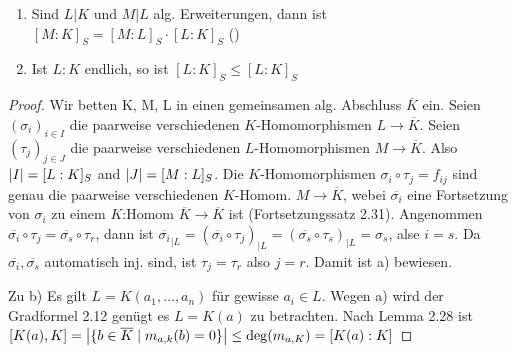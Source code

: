 \documentclass[../main.tex]{subfiles}
\begin{document}
\begin{lemma}
    \begin{enumerate}[label=\alph*)]
        \item Sind $L|K$ und $M|L$ alg. Erweiterungen, dann ist $[M:K]_S = [M:L]_S \cdot [L:K]_S$ ()
        \item Ist $L:K$ endlich, so ist $[L:K]_S \leq [L:K]_S$
    \end{enumerate}
\end{lemma}
\begin{proof}
    Wir betten K, M, L in einen gemeinsamen alg. Abschluss $\overline{K}$ ein.
    Seien $(\sigma_i)_{i\in I}$ die paarweise verschiedenen $K$-Homomorphismen $L\rightarrow \overline{K}$.
    Seien $(\tau_j)_{j\in J}$ die paarweise verschiedenen $L$-Homomorphismen $M\rightarrow \overline{K}$.
    Also $\left\vert I \right\vert = [L:K]_S$ and $\left\vert J \right\vert=[M:L]_S$.
    Die $K$-Homomorphismen $\sigma_i \circ \tau_j = f_{ij}$ sind genau die paarweise verschiedenen $K$-Homom. $M\rightarrow \overline{K}$, webei $\overline{\sigma_i}$ eine Fortsetzung von $\sigma_i$ zu einem $K$:Homom $\overline{K} \rightarrow \overline{K}$ ist (Fortsetzungssatz 2.31). 
    Angenommen $\overline{\sigma_i} \circ \tau_j = \overline{\sigma_s} \circ \tau_r$, dann ist $\overline{\sigma_i}_{|L} = (\overline{\sigma_i} \circ \tau_j)_{|L} =(\overline{\sigma_s} \circ \tau_s)_{|L} = \sigma_s$, alse $i=s$.
    Da $\overline{\sigma_i},\overline{\sigma_s}$ automatisch inj. sind, ist $\tau_j = \tau_r$ also $j = r$.
    Damit ist a) bewiesen.

    Zu b)
    Es gilt $L=K(a_1, \dots, a_n)$ für gewisse $a_i\in L$. Wegen a) wird der Gradformel 2.12 genügt es $L=K(a)$ zu betrachten.
    Nach Lemma 2.28 ist $[K(a), K]=\left\vert \{b\in \overline{K}\mid m_{a,k}(b)=0\} \right\vert \leq \deg(m_{a,K}) = [K(a):K]$
\end{proof}
\end{document}

